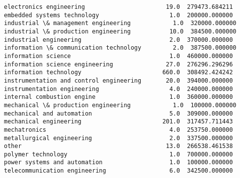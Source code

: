 \documentclass[11pt]{article}
\begin{document}
\begin{tcolorbox}[breakable, size=fbox, boxrule=.5pt, pad at break*=1mm, opacityfill=0]
\begin{Verbatim}[commandchars=\\\{\}]
electronics engineering                       19.0  279473.684211
embedded systems technology                    1.0  200000.000000
industrial \& management engineering            1.0  320000.000000
industrial \& production engineering           10.0  384500.000000
industrial engineering                         2.0  370000.000000
information \& communication technology         2.0  387500.000000
information science                            1.0  460000.000000
information science engineering               27.0  276296.296296
information technology                       660.0  308492.424242
instrumentation and control engineering       20.0  394000.000000
instrumentation engineering                    4.0  240000.000000
internal combustion engine                     1.0  360000.000000
mechanical \& production engineering            1.0  100000.000000
mechanical and automation                      5.0  309000.000000
mechanical engineering                       201.0  317457.711443
mechatronics                                   4.0  253750.000000
metallurgical engineering                      2.0  337500.000000
other                                         13.0  266538.461538
polymer technology                             1.0  700000.000000
power systems and automation                   1.0  100000.000000
telecommunication engineering                  6.0  342500.000000


\end{Verbatim}
\end{tcolorbox}
\end{document}
